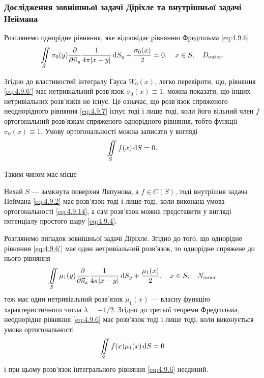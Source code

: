 \subsubsection{Дослідження зовнішньої задачі Діріхле та внутрішньої задачі Неймана}

Розглянемо однорідне рівняння, яке відповідає рівнянню Фредгольма \eqref{eq:4.9.6}
\begin{equation}
	\label{eq:4.9.6'}
	\displaystyle\iint\limits_S \sigma_0(y) \frac{\partial}{\partial \vec n_y} \frac{1}{4 \pi |x - y|} \mathop{}\!\mathrm{d} S_y + \frac{\sigma_0(x)}{2} = 0, \quad x \in S, \quad D_{\text{outer}}.
\end{equation}

Згідно до властивостей інтегралу Гауса $W_0(x)$, легко перевірити, що, рівняння \eqref{eq:4.9.6'} має нетривіальний розв'язок $\sigma_0(x) \equiv 1$, можна показати, що інших нетривіальних розв'язків не існує. Це означає, що розв'язок спряженого неоднорідного рівняння \eqref{eq:4.9.7} існує тоді і лише тоді, коли його вільний член $f$ ортогональний розв'язкам спряженого однорідного рівняння, тобто функції $\sigma_0(x) \equiv 1$. Умову ортогональності можна записати у вигляді 
\begin{equation}
	\label{eq:4.9.14}
	\displaystyle\iint\limits_S f(x) \mathop{}\!\mathrm{d} S = 0.
\end{equation}

Таким чином має місце

\begin{theorem}
	Нехай $S$ --- замкнута поверхня Ляпунова, а $f \in C(S)$, тоді внутрішня задача Неймана \eqref{eq:4.9.2} має розв'язок тоді і лише тоді, коли виконана умова ортогональності \eqref{eq:4.9.14}, а сам розв'язок можна представити у вигляді потенціалу простого шару \eqref{eq:4.9.4}.
\end{theorem}

Розглянемо випадок зовнішньої задачі Діріхле. Згідно до того, що однорідне рівняння \eqref{eq:4.9.6'} має один нетривіальний розв'язок, то однорідне спряжене до нього рівняння
\begin{equation}
	\label{eq:4.9.7'}
	\displaystyle\iint\limits_S \mu_1(y) \frac{\partial}{\partial \vec n_x} \frac{1}{4 \pi |x - y|} \mathop{}\!\mathrm{d} S_y + \frac{\mu_1(x)}{2}, \quad x \in S, \quad N_{\text{inner}}
\end{equation}
теж має один нетривіальний розв'язок $\mu_1(x)$ --- власну функцію характеристичного числа $\lambda = -1/2$. Згідно до третьої теореми Фредгольма, неоднорідне рівняння \eqref{eq:4.9.6} має розв'язок тоді і лише тоді, коли виконується умова ортогональності
\begin{equation}
	\displaystyle\iint\limits_S f(x) \mu_1(x) \mathop{}\!\mathrm{d} S = 0
\end{equation}
і при цьому розв'язок інтегрального рівняння \eqref{eq:4.9.6} неєдиний. \medskip

